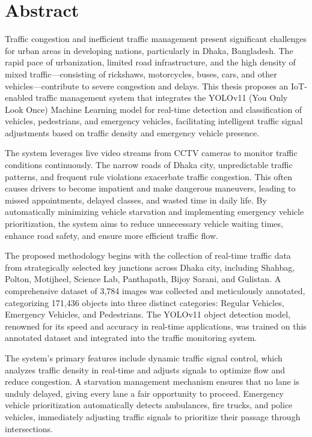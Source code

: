 \chapter*{Abstract}

Traffic congestion and inefficient traffic management present significant challenges for urban areas in developing nations, particularly in Dhaka, Bangladesh. The rapid pace of urbanization, limited road infrastructure, and the high density of mixed traffic—consisting of rickshaws, motorcycles, buses, cars, and other vehicles—contribute to severe congestion and delays. This thesis proposes an IoT-enabled traffic management system that integrates the YOLOv11 (You Only Look Once) Machine Learning model for real-time detection and classification of vehicles, pedestrians, and emergency vehicles, facilitating intelligent traffic signal adjustments based on traffic density and emergency vehicle presence.

The system leverages live video streams from CCTV cameras to monitor traffic conditions continuously. The narrow roads of Dhaka city, unpredictable traffic patterns, and frequent rule violations exacerbate traffic congestion. This often causes drivers to become impatient and make dangerous maneuvers, leading to missed appointments, delayed classes, and wasted time in daily life. By automatically minimizing vehicle starvation and implementing emergency vehicle prioritization, the system aims to reduce unnecessary vehicle waiting times, enhance road safety, and ensure more efficient traffic flow.

The proposed methodology begins with the collection of real-time traffic data from strategically selected key junctions across Dhaka city, including Shahbag, Polton, Motijheel, Science Lab, Panthapath, Bijoy Sarani, and Gulistan. A comprehensive dataset of 3,784 images was collected and meticulously annotated, categorizing 171,436 objects into three distinct categories: Regular Vehicles, Emergency Vehicles, and Pedestrians. The YOLOv11 object detection model, renowned for its speed and accuracy in real-time applications, was trained on this annotated dataset and integrated into the traffic monitoring system.

The system's primary features include dynamic traffic signal control, which analyzes traffic density in real-time and adjusts signals to optimize flow and reduce congestion. A starvation management mechanism ensures that no lane is unduly delayed, giving every lane a fair opportunity to proceed. Emergency vehicle prioritization automatically detects ambulances, fire trucks, and police vehicles, immediately adjusting traffic signals to prioritize their passage through intersections.

